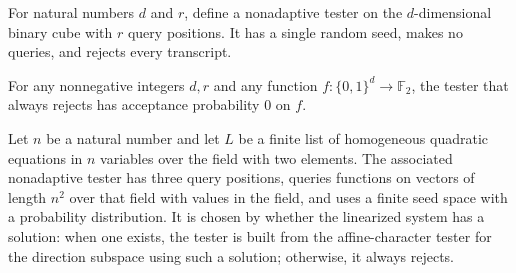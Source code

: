 \begin{definition}
\leanok
{}
For natural numbers $d$ and $r$, define a nonadaptive tester on the $d$-dimensional
binary cube with $r$ query positions. It has a single random seed, makes no queries, and
rejects every transcript.
\end{definition}

\begin{theorem}
\leanok
{}
For any nonnegative integers $d,r$ and any function $f:\{0,1\}^d\to\mathbb F_2$, the
tester that always rejects has acceptance probability $0$ on $f$.
\end{theorem}

\begin{definition}
\label{FABL.linearizedQuadraticSystemCharacterTester}
\leanok
{}
Let $n$ be a natural number and let $L$ be a finite list of homogeneous quadratic
equations in $n$ variables over the field with two elements. The associated nonadaptive
tester has three query positions, queries functions on vectors of length $n^2$ over that
field with values in the field, and uses a finite seed space with a probability
distribution. It is chosen by whether the linearized system has a solution: when one
exists, the tester is built from the affine-character tester for the direction subspace
using such a solution; otherwise, it always rejects.
\end{definition}

